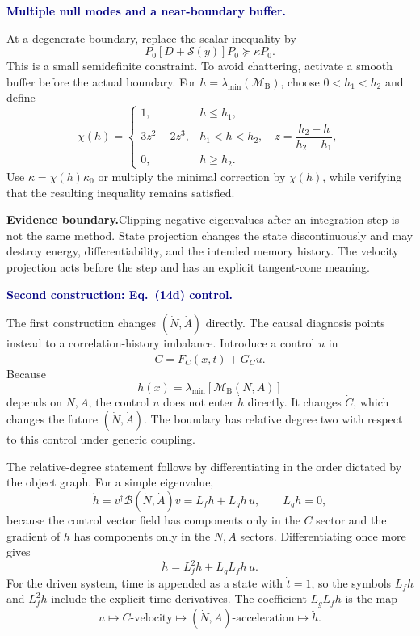 \documentclass[10pt]{article}
\newcommand{\MB}{\mathcal M_{\mathrm B}}
\newcommand{\LB}{\mathcal B}
\newcommand{\warningbox}[1]{%
  \par\medskip
  \noindent\colorbox{palered}{%
    \parbox{\dimexpr\linewidth-2\fboxsep\relax}{%
      \textcolor{brick}{\textbf{Evidence boundary.}}\quad #1%
    }%
  }\par\medskip
}
\newcommand{\flowlead}[1]{%
  \par\medskip
  \needspace{3\baselineskip}%
  \noindent\textcolor{navy}{\textbf{#1.}}\enspace\ignorespaces
}
\begin{document}
\flowlead{Multiple null modes and a near-boundary buffer}

At a degenerate boundary, replace the scalar inequality by
\[
P_0\left[D+\mathcal S(y)\right]P_0\succeq\kappa P_0.
\tag{6.9}
\]
This is a small semidefinite constraint.  To avoid chattering, activate a
smooth buffer before the actual boundary.  For
\(h=\lambda_{\min}(\MB)\), choose \(0<h_1<h_2\) and define
\[
\chi(h)=
\begin{cases}
1,&h\leq h_1,\\
3z^2-2z^3,&h_1<h<h_2,\quad
z=\dfrac{h_2-h}{h_2-h_1},\\
0,&h\geq h_2.
\end{cases}
\tag{6.10}
\]
Use \(\kappa=\chi(h)\kappa_0\) or multiply the minimal correction by
\(\chi(h)\), while verifying that the resulting inequality remains
satisfied.

\warningbox{Clipping negative eigenvalues after an integration step is not
the same method.  State projection changes the state discontinuously and may
destroy energy, differentiability, and the intended memory history.  The
velocity projection acts before the step and has an explicit tangent-cone
meaning.}

\flowlead{Second construction: Eq.~(14d) control}

The first construction changes \((\dot N,\dot A)\) directly.  The causal
diagnosis points instead to a correlation-history imbalance.  Introduce a
control \(u\) in
\[
\dot C=F_C(x,t)+G_Cu.
\tag{6.11}
\]
Because
\[
h(x)=\lambda_{\min}\!\left[\MB(N,A)\right]
\tag{6.12}
\]
depends on \(N,A\), the control \(u\) does not enter \(\dot h\) directly.
It changes \(\dot C\), which changes the future \((\dot N,\dot A)\).  The
boundary has relative degree two with respect to this control under generic
coupling.

The relative-degree statement follows by differentiating in the order
dictated by the object graph.  For a simple eigenvalue,
\[
\dot h
=v^\dagger\LB(\dot N,\dot A)v
=L_fh+L_gh\,u,
\qquad L_gh=0,
\tag{6.12a}
\]
because the control vector field has components only in the \(C\) sector and
the gradient of \(h\) has components only in the \(N,A\) sectors.
Differentiating once more gives
\[
\ddot h=L_f^2h+L_gL_fh\,u.
\tag{6.12b}
\]
For the driven system, time is appended as a state with \(\dot t=1\), so the
symbols \(L_fh\) and \(L_f^2h\) include the explicit time derivatives.  The
coefficient \(L_gL_fh\) is the map
\[
u\longmapsto
C\text{-velocity}
\longmapsto
(\dot N,\dot A)\text{-acceleration}
\longmapsto
\ddot h.
\tag{6.12c}
\]
\end{document}
